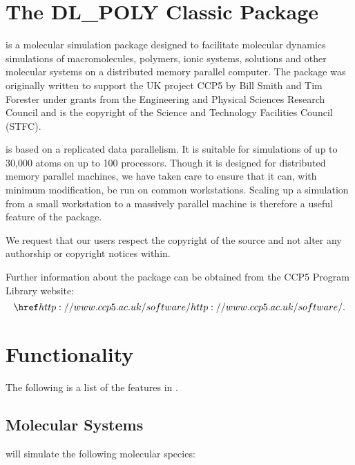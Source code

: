 
\section{The DL\_POLY Classic Package}

\D{} \cite{smith-96a} is a molecular simulation package designed to
facilitate molecular dynamics simulations of macromolecules, polymers,
ionic systems, solutions and other molecular systems on a distributed
memory parallel computer. The package was originally written to
support the UK project CCP5 by Bill Smith and Tim Forester
\cite{smith-87a} under grants from the Engineering and Physical
Sciences Research Council and is the copyright of the Science and
Technology Facilities Council (STFC).

\D{} is based on a replicated data parallelism. It is suitable for simulations
of up to 30,000 atoms on up to 100 processors.  Though it is designed for
distributed memory parallel machines, we have taken care to ensure that it
can, with minimum modification, be run on common workstations. Scaling up
a simulation from a small workstation to a massively parallel machine is
therefore a useful feature of the package.

We request that our users respect the copyright of the \D{} source and not alter
any authorship or copyright notices within. 

Further information about the \D{} package can be obtained from
the CCP5 Program Library website: \[\SOFT{}.\index{WWW}\]

\section{Functionality}

The following is a list of the features in \D{}.

\subsection{Molecular Systems}

\D{} will simulate the following molecular species:

